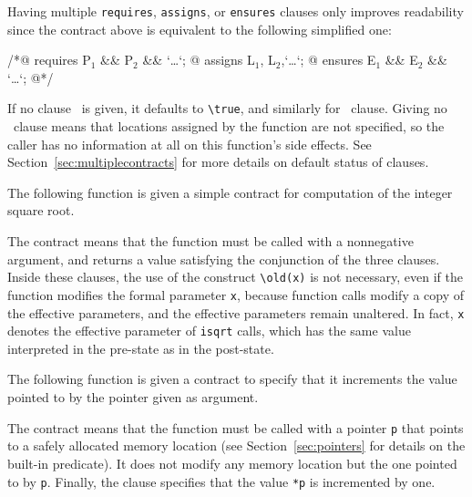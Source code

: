 Having multiple \lstinline|requires|, \lstinline|assigns|, or 
\lstinline|ensures| clauses only improves 
readability since the contract above is equivalent to the following
simplified one:
\begin{listing}{1}
/*@ requires P$_1$ && P$_2$ && `\dots`;
  @ assigns L$_1$, L$_2$,`\dots`;
  @ ensures E$_1$ && E$_2$ && `\dots`;
  @*/
\end{listing}
If no clause \requires\ is given, it defaults to
\lstinline!\true!, and similarly for \ensures\ clause.
Giving no \assigns\ clause
means that locations assigned by the function are not specified, so
the caller has no information at all on this function's side
effects. See Section~\ref{sec:multiplecontracts} for more details on
default status of clauses.

\begin{example}
  The following function is given a simple contract for computation of
  the integer square root.

%
  The contract means that the function must be called with a
  nonnegative argument, and returns a value satisfying
  the conjunction of the three \ensures{} clauses.
  Inside these \ensures{} clauses, the use of the construct \lstinline|\old(x)|
  is not necessary, even if the function modifies the formal
  parameter
  \lstinline|x|, because function calls modify a copy of the effective parameters,
  and the effective parameters remain unaltered.  In fact, \lstinline|x| denotes
  the effective parameter of \lstinline|isqrt| calls, which has the same value
  interpreted in the pre-state as in the post-state.

\end{example}

\begin{example}
  The following function is given a contract to specify that it increments
  the value pointed to by the pointer given as argument.

%
  The contract means that the function must be called with a pointer
  \lstinline|p| that points to a safely allocated memory location (see
  Section~\ref{sec:pointers} for details on the \valid built-in
  predicate). It does not modify any memory location but the one
  pointed to by \lstinline|p|. Finally, the \ensures clause specifies that
  the value \lstinline!*p! is incremented by one.
\end{example}

